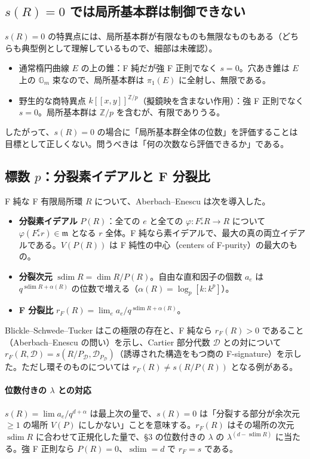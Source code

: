 \documentclass[11pt,a4paper]{ltjsarticle}
\theoremstyle{plain}
\theoremstyle{definition}
\theoremstyle{remark}
\theoremstyle{plain}
\newcommand{\m}{\mathfrak{m}}
\begin{document}
\subsection{$s(R) = 0$ では局所基本群は制御できない}
$s(R) = 0$ の特異点には、局所基本群が有限なものも無限なものもある（どちらも典型例として理解しているもので、細部は未確認）。
\begin{itemize}
  \item 通常楕円曲線 $E$ の上の錐：F 純だが強 F 正則でなく $s = 0$。穴あき錐は $E$ 上の $\mathbb{G}_m$ 束なので、局所基本群は $\pi_1(E)$ に全射し、無限である。
  \item 野生的な商特異点 $k[[x,y]]^{\mathbb{Z}/p}$（擬鏡映を含まない作用）：強 F 正則でなく $s = 0$。局所基本群は $\mathbb{Z}/p$ を含むが、有限でありうる。
\end{itemize}
したがって、$s(R) = 0$ の場合に「局所基本群全体の位数」を評価することは目標として正しくない。問うべきは「何の次数なら評価できるか」である。

\subsection{標数 $p$：分裂素イデアルと F 分裂比}
F 純な F 有限局所環 $R$ について、Aberbach--Enescu は次を導入した。
\begin{itemize}
  \item \textbf{分裂素イデアル} $P(R)$：全ての $e$ と全ての $\varphi\colon F^e_*R\to R$ について $\varphi(F^e_*r)\in\m$ となる $r$ 全体。F 純なら素イデアルで、最大の真の両立イデアルである。$V(P(R))$ は F 純性の中心（centers of F-purity）の最大のもの。
  \item \textbf{分裂次元} $\operatorname{sdim}R = \dim R/P(R)$。自由な直和因子の個数 $a_e$ は $q^{\operatorname{sdim}R+\alpha(R)}$ の位数で増える（$\alpha(R) = \log_p[k:k^p]$）。
  \item \textbf{F 分裂比} $r_F(R) = \lim_e a_e/q^{\operatorname{sdim}R+\alpha(R)}$。
\end{itemize}
Blickle--Schwede--Tucker はこの極限の存在と、F 純なら $r_F(R)>0$ であること（Aberbach--Enescu の問い）を示し、Cartier 部分代数 $\mathscr{D}$ との対について $r_F(R,\mathscr{D}) = s(R/P_\mathscr{D},\mathscr{D}_{P_\mathscr{D}})$（誘導された構造をもつ商の F-signature）を示した。ただし環そのものについては $r_F(R)\neq s(R/P(R))$ となる例がある。

\paragraph{位数付きの $\lambda$ との対応}
$s(R) = \lim a_e/q^{d+\alpha}$ は最上次の量で、$s(R) = 0$ は「分裂する部分が余次元 $\ge1$ の場所 $V(P)$ にしかない」ことを意味する。$r_F(R)$ はその場所の次元 $\operatorname{sdim}R$ に合わせて正規化した量で、\S 3 の位数付きの $\lambda$ の $\lambda^{(d-\operatorname{sdim}R)}$ に当たる。強 F 正則なら $P(R) = 0$、$\operatorname{sdim} = d$ で $r_F = s$ である。
\end{document}
